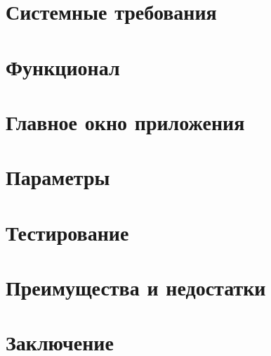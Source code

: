     \section{Системные требования}
    \pagebreak

    \section{Функционал}
    \pagebreak

    \section{Главное окно приложения}
    \pagebreak

    \section{Параметры}
    \pagebreak

    \section{Тестирование}
    \pagebreak

    \section{Преимущества и недостатки}
    \pagebreak

    \section*{Заключение}
    \pagebreak

